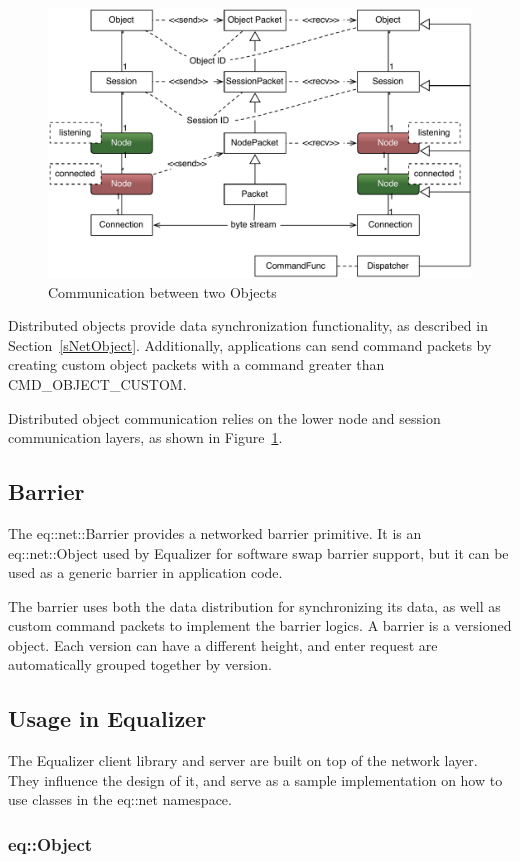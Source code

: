 \documentclass[10pt,a4]{scrartcl}
\newcommand{\fig}[1]{Figure~\ref{#1}}
\newcommand{\sref}[1]{Section~\ref{#1}}
\begin{document}
\begin{figure}
  \includegraphics[width=.618\textwidth]{images/netObject.pdf}
  {\caption{\label{fNetObject}Communication between two Objects}}
\end{figure}
Distributed objects provide data synchronization functionality, as
described in \sref{sNetObject}. Additionally, applications can send
command packets by creating custom object packets with a command greater
than \textsf{CMD\_OBJECT\_CUSTOM}.

Distributed object communication relies on the lower node and session
communication layers, as shown in \fig{fNetObject}.

\subsection{Barrier}

The \textsf{eq::net::Barrier} provides a networked barrier primitive. It
is an \textsf{eq::net::Object} used by Equalizer for software swap
barrier support, but it can be used as a generic barrier in application
code.

The barrier uses both the data distribution for synchronizing its data,
as well as custom command packets to implement the barrier logics. A
barrier is a versioned object. Each version can have a different height,
and enter request are automatically grouped together by version.


\subsection{\label{sNetUsage}Usage in Equalizer}

The Equalizer client library and server are built on top of the network
layer. They influence the design of it, and serve as a sample
implementation on how to use classes in the \textsf{eq::net} namespace.

\subsubsection{\label{sEqObject}eq::Object}
\end{document}
